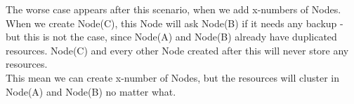 
The worse case appears after this scenario, when we add x-numbers of Nodes. \\
When we create Node(C), this Node will ask Node(B) if it needs any backup - but this is not the case, since Node(A) and Node(B) already have duplicated resources. Node(C) and every other Node created after this will never store any resources.\\
This mean we can create x-number of Nodes, but the resources will cluster in Node(A) and Node(B) no matter what. 



